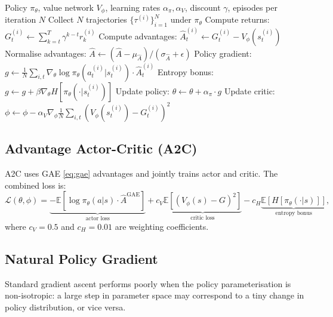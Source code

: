 \documentclass[11pt, a4paper]{article}
\newcommand{\E}{\mathbb{E}}
\newcommand{\grad}{\nabla}
\begin{document}
\begin{algorithm}[H]
\caption{REINFORCE with Baseline \citep{williams1992}}
\label{alg:reinforce}
\begin{algorithmic}[1]
\Require Policy $\pi_\theta$, value network $V_\phi$, learning rates $\alpha_\pi, \alpha_V$,
         discount $\gamma$, episodes per iteration $N$
    \State Collect $N$ trajectories $\{\tau^{(i)}\}_{i=1}^N$ under $\pi_\theta$
        \State Compute returns: $G_t^{(i)} \leftarrow \sum_{k=t}^{T} \gamma^{k-t} r_k^{(i)}$
        \State Compute advantages: $\hat{A}_t^{(i)} \leftarrow G_t^{(i)} - V_\phi(s_t^{(i)})$
    \EndFor
    \State Normalise advantages: $\hat{A} \leftarrow (\hat{A} - \mu_{\hat{A}}) / (\sigma_{\hat{A}} + \epsilon)$
    \State Policy gradient: $g \leftarrow \frac{1}{N} \sum_{i,t} \grad_\theta \log \pi_\theta(a_t^{(i)} | s_t^{(i)}) \cdot \hat{A}_t^{(i)}$
    \State Entropy bonus: $g \leftarrow g + \beta \grad_\theta H[\pi_\theta(\cdot | s_t^{(i)})]$
    \State Update policy: $\theta \leftarrow \theta + \alpha_\pi \cdot g$
    \State Update critic: $\phi \leftarrow \phi - \alpha_V \grad_\phi \frac{1}{N} \sum_{i,t} (V_\phi(s_t^{(i)}) - G_t^{(i)})^2$
\EndFor
\end{algorithmic}
\end{algorithm}

\subsection{Advantage Actor-Critic (A2C)}

A2C uses GAE \eqref{eq:gae} advantages and jointly trains actor and critic.
The combined loss is:
\begin{equation}
    \mathcal{L}(\theta, \phi)
    = \underbrace{-\E\left[\log \pi_\theta(a|s) \cdot \hat{A}^{\mathrm{GAE}}\right]}_{\text{actor loss}}
    + c_V \underbrace{\E\left[(V_\phi(s) - G)^2\right]}_{\text{critic loss}}
    - c_H \underbrace{\E\left[H[\pi_\theta(\cdot|s)]\right]}_{\text{entropy bonus}},
    \label{eq:a2c_loss}
\end{equation}
where $c_V = 0.5$ and $c_H = 0.01$ are weighting coefficients.

\subsection{Natural Policy Gradient}

Standard gradient ascent performs poorly when the policy parameterisation is
non-isotropic: a large step in parameter space may correspond to a tiny change
in policy distribution, or vice versa.
\end{document}
